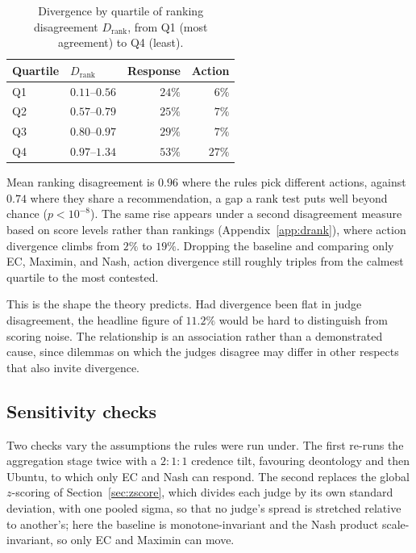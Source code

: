 \documentclass[10pt,twocolumn,a4paper]{article}
\begin{document}
\begin{table}[htbp]
\centering
\small
\caption{Divergence by quartile of ranking disagreement
$D_{\text{rank}}$, from Q1 (most agreement) to Q4 (least).}
\label{tab:conditional}
\vspace{2pt}
\begin{tabular}{@{}l l r r@{}}
\toprule
\textbf{Quartile} & $D_{\text{rank}}$ & \textbf{Response} & \textbf{Action} \\
\midrule
Q1 & $0.11$--$0.56$ & $24\%$ & $6\%$  \\
Q2 & $0.57$--$0.79$ & $25\%$ & $7\%$  \\
Q3 & $0.80$--$0.97$ & $29\%$ & $7\%$  \\
Q4 & $0.97$--$1.34$ & $53\%$ & $27\%$ \\
\bottomrule
\end{tabular}
\end{table}

 Mean ranking disagreement is
$0.96$ where the rules pick different actions, against $0.74$ where
they share a recommendation, a gap a rank test puts well beyond chance
($p < 10^{-8}$). The same rise appears under a second disagreement measure
based on score levels rather than rankings
(Appendix~\ref{app:drank}), where action divergence climbs from $2\%$
to $19\%$. Dropping the baseline and comparing only EC, Maximin, and
Nash, action divergence still roughly triples from the calmest
quartile to the most contested.

This is the shape the theory predicts. Had divergence been flat in
judge disagreement, the headline figure of $11.2\%$ would be hard to
distinguish from scoring noise. The relationship is an association
rather than a demonstrated cause, since dilemmas on which the judges
disagree may differ in other respects that also invite divergence.

\subsection{Sensitivity checks}
\label{sec:results-credences}

Two checks vary the assumptions the rules were run under. The first
re-runs the aggregation stage twice with a $2{:}1{:}1$ credence tilt,
favouring deontology and then Ubuntu, to which only EC and Nash can
respond. The second replaces
the global $z$-scoring of Section~\ref{sec:zscore}, which divides each
judge by its own standard deviation, with one pooled sigma, so that no
judge's spread is stretched relative to another's; here the baseline is
monotone-invariant and the Nash product scale-invariant, so only EC and
Maximin can move.
\end{document}
